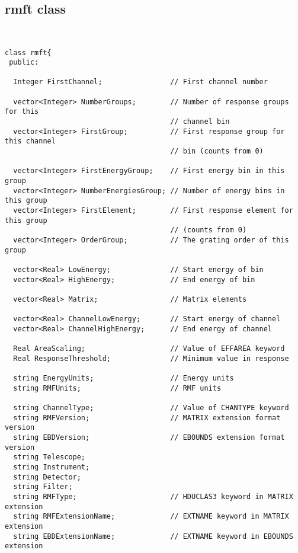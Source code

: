 \documentclass[11pt]{book}
\begin{document}
\subsection{rmft class}

\begin{verbatim}


class rmft{
 public:

  Integer FirstChannel;                // First channel number 

  vector<Integer> NumberGroups;        // Number of response groups for this 
                                       // channel bin 
  vector<Integer> FirstGroup;          // First response group for this channel
                                       // bin (counts from 0)

  vector<Integer> FirstEnergyGroup;    // First energy bin in this group 
  vector<Integer> NumberEnergiesGroup; // Number of energy bins in this group 
  vector<Integer> FirstElement;        // First response element for this group
                                       // (counts from 0)
  vector<Integer> OrderGroup;          // The grating order of this group 

  vector<Real> LowEnergy;              // Start energy of bin 
  vector<Real> HighEnergy;             // End energy of bin 

  vector<Real> Matrix;                 // Matrix elements 

  vector<Real> ChannelLowEnergy;       // Start energy of channel 
  vector<Real> ChannelHighEnergy;      // End energy of channel 

  Real AreaScaling;                    // Value of EFFAREA keyword 
  Real ResponseThreshold;              // Minimum value in response 

  string EnergyUnits;                  // Energy units
  string RMFUnits;                     // RMF units

  string ChannelType;                  // Value of CHANTYPE keyword 
  string RMFVersion;                   // MATRIX extension format version 
  string EBDVersion;                   // EBOUNDS extension format version 
  string Telescope;                             
  string Instrument;
  string Detector;
  string Filter;
  string RMFType;                      // HDUCLAS3 keyword in MATRIX extension 
  string RMFExtensionName;             // EXTNAME keyword in MATRIX extension 
  string EBDExtensionName;             // EXTNAME keyword in EBOUNDS extension 

\end{verbatim}
\end{document}
